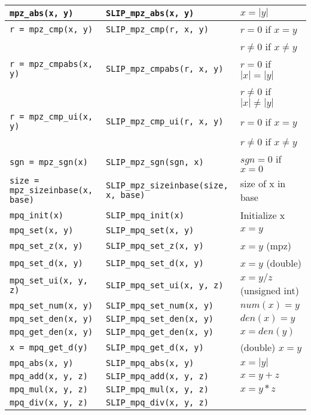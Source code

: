 \documentclass[12pt]{article}
\theoremstyle{definition}
\begin{document}
{\begin{center}
\begin{tabular}{|l|l|l|}
\verb|mpz_abs(x, y)|
    & \verb|SLIP_mpz_abs(x, y)|
    & $x = |y|$ \\ \hline
\verb|r = mpz_cmp(x, y)|
    & \verb|SLIP_mpz_cmp(r, x, y)|
    & $r = 0$ if $x=y$\\&& $r\neq 0$  if $x\neq y$ \\ \hline
\verb|r = mpz_cmpabs(x, y)|
    & \verb|SLIP_mpz_cmpabs(r, x, y)|
    & $r = 0$ if $|x|=|y|$\\&&  $r\neq 0$  if $|x|\neq |y|$\\ \hline
\verb|r = mpz_cmp_ui(x, y)|
    & \verb|SLIP_mpz_cmp_ui(r, x, y)|
    & $r = 0$ if $x=y$\\&&  $r\neq 0$  if $x\neq y$ \\ \hline
\verb|sgn = mpz_sgn(x)|
    & \verb|SLIP_mpz_sgn(sgn, x)|
    & $sgn = 0$ if $x = 0$ \\ \hline
\verb|size = mpz_sizeinbase(x, base)|
    & \verb|SLIP_mpz_sizeinbase(size, x, base)|
    & size of x in base \\ \hline
\verb|mpq_init(x)|
    & \verb|SLIP_mpq_init(x)|
    & Initialize x \\ \hline
\verb|mpq_set(x, y)|
    & \verb|SLIP_mpq_set(x, y)|
    & $x = y$ \\ \hline
\verb|mpq_set_z(x, y)|
    & \verb|SLIP_mpq_set_z(x, y)|
    & $x = y$ (mpz) \\ \hline
\verb|mpq_set_d(x, y)|
    & \verb|SLIP_mpq_set_d(x, y)|
    & $x=y$ (double) \\ \hline
\verb|mpq_set_ui(x, y, z)|
    & \verb|SLIP_mpq_set_ui(x, y, z)|
    & $x = y/z$ (unsigned int) \\ \hline
\verb|mpq_set_num(x, y)|
    & \verb|SLIP_mpq_set_num(x, y)|
    & $num(x) = y$ \\ \hline
\verb|mpq_set_den(x, y)|
    & \verb|SLIP_mpq_set_den(x, y)|
    & $den(x) = y$ \\ \hline
\verb|mpq_get_den(x, y)|
    & \verb|SLIP_mpq_get_den(x, y)|
    & $x = den(y)$ \\ \hline
\verb|x = mpq_get_d(y)|
    & \verb|SLIP_mpq_get_d(x, y)|
    & (double) $x = y$ \\ \hline
\verb|mpq_abs(x, y)|
    & \verb|SLIP_mpq_abs(x, y)|
    & $x = |y|$ \\ \hline
\verb|mpq_add(x, y, z)|
    & \verb|SLIP_mpq_add(x, y, z)|
    & $x = y+z$ \\ \hline
\verb|mpq_mul(x, y, z)|
    & \verb|SLIP_mpq_mul(x, y, z)|
    & $x = y*z$ \\ \hline
\verb|mpq_div(x, y, z)|
    & \verb|SLIP_mpq_div(x, y, z)|

\end{tabular}
\end{center}}
\end{document}
